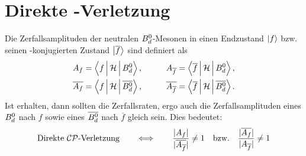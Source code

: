 \section[Direkte \CP-Verletzung]{Direkte \boldmath\CP-Verletzung\unboldmath}
Die Zerfallsamplituden der neutralen $\text{$B_d^0$}$-Mesonen in einen Endzustand $\Ket{f}$ bzw. seinen \CP-konjugierten Zustand $\Ket{\overline{f}}$ sind definiert als
\begin{alignat}{2}
\nonumber A_f &= \Braket{f|\mathcal{H}|\text{\Bd}\vphantom{\text{\Bdbar}}}, && \qquad A_{\overline{f}} = \Braket{\overline{f}|\mathcal{H}|\text{\Bd}\vphantom{\text{\Bdbar}}}, \\
          \overline{A_f} &= \Braket{f|\mathcal{H}|\text{\Bdbar}}, && \qquad  \overline{A_{\overline{f}}} = \Braket{\overline{f}|\mathcal{H}|\text{\Bdbar}}. \label{eq:decay_amplitudes}
\end{alignat}
Ist \CP erhalten, dann sollten die Zerfallsraten, ergo auch die Zerfallsamplituden eines $\text{$B_d^0$}$ nach $f$ sowie eines $\text{$\overline{B_d^0}$}$ nach $\overline{f}$ gleich sein. Dies bedeutet:
\begin{align}
\text{Direkte $\mathcal{CP}$-Verletzung} \qquad \Longleftrightarrow \qquad \frac{|A_f|}{|\overline{A_{\overline{f}}}|} \neq 1 \quad \text{bzw.} \quad \frac{|\overline{A_f}|}{|A_{\overline{f}}|} \neq 1
\end{align}


